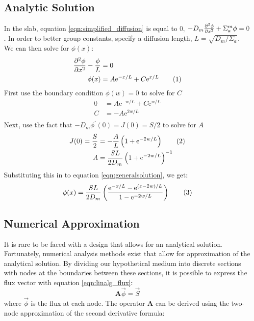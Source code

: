\documentclass[10pt,peerreviewca]{IEEEtran} %
\newcommand{\e}{\mathrm{e}}
\newcommand\numberthis{\addtocounter{equation}{1}\tag{\theequation}}
\newcommand{\opmat}[1]{\mathbf{#1}}
\begin{document}
	\subsection{Analytic Solution}
	In the slab, equation \ref{eqn:simplified_diffusion} is equal to $0$, $-D_m \pdv[2]{\phi}{x} + \Sigma^m_a \phi = 0 $. In order to better group constants, specify a diffusion length, $L = \sqrt{D_m / \Sigma_{a}}$. We can then solve for $\phi(x)$:
	\begin{align*}
		\pdv[2]{\phi}{x} - \frac{\phi}{L} &= 0 \\
		\phi(x) &= A \e^{-x/L} + C \e^{x/L} \numberthis \label{eqn:generalsolution}
	\end{align*}
	First use the boundary condition $\phi(w)=0$ to solve for $C$
	\begin{align*}
		0 &= A \e^{-w/L} + C \e^{w/L} \\
		C &= -A \e^{2w/L} \\
	\end{align*}
	Next, use the fact that $ -D_m \phi^\prime(0) = J(0) = S/2$ to solve for $A$
	\begin{align*}
		J(0) = \frac{S}{2} &= -\frac{A}{L} \left( 1 + \e^{-2w/L} \right) \numberthis \label{eqn:leftboundary} \\
		A &= \frac{S L}{2 D_m}\left( 1 + \e^{-2w/L} \right)^{-1}
	\end{align*}
	Substituting this in to equation \ref{eqn:generalsolution}, we get:
	\begin{equation*}
		\phi(x) = \frac{S L}{2 D_m} \left( \frac{\e^{-x/L} - \e^{\left(x-2w\right)/L}}{1 - \e^{-2w/L}} \right) \numberthis \label{eqn:analyticcartesian}
	\end{equation*}

	\subsection{Numerical Approximation} \label{ssec:numerical}
	It is rare to be faced with a design that allows for an analytical solution. Fortunately, numerical analysis methods exist that allow for approximation of the analytical solution. By dividing our hypothetical medium into discrete sections with nodes at the boundaries between these sections, it is possible to express the flux vector with equation \ref{eqn:linalg_flux}:
	\begin{equation}
		\opmat{A} \vec{\phi} = \vec{S}
		\label{eqn:linalg_flux}
	\end{equation}
	where $\vec{\phi}$ is the flux at each node. The operator $\opmat{A}$ can be derived using the two-node approximation of the  second derivative formula:
	
\end{document}
